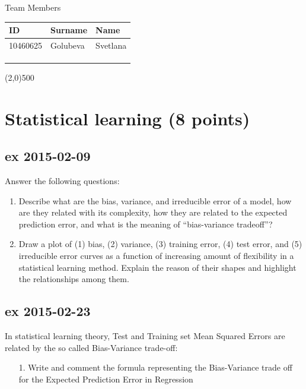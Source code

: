 \documentclass[a4paper,12pt,titlepage]{article} %
\begin{document}
\begin{titlepage}
		\vspace{20pt}
		
		\begin{center}
			{\large Team Members}
		\end{center}
		\begin{tabularx}{\textwidth}{|X|X|X|}
			\hline
			ID & Surname & Name\\
			\hline
			10460625 & Golubeva & Svetlana\\
			\hline
			&  & \\
			\hline
			&  & \\
			\hline
			&  & \\
			\hline
		\end{tabularx}
		
		\vspace{\fill}
		\begin{center}
			\line(2,0){500}
		\end{center}
		
	\end{titlepage}
\tableofcontents

\newpage
\section{Statistical learning (8 points)}
\subsection{ex 2015-02-09}
Answer the following questions:
\begin{enumerate}
\item Describe what are the bias, variance, and irreducible error of a model, how are they related with its complexity, how they are related to the expected prediction error, and what is the meaning of “bias-variance tradeoff”?
\item Draw a plot of (1) bias, (2) variance, (3) training error, (4) test error, and (5) irreducible error curves as a function of increasing amount of flexibility in a statistical learning method. Explain the reason of their shapes and highlight the relationships among them.
\end{enumerate}

\subsection{ex 2015-02-23}
In statistical learning theory, Test and Training set Mean Squared Errors are related by the so called Bias-Variance trade-off:
\begin{itemize}
\item[1.] Write and comment the formula representing the Bias-Variance trade off for the Expected Prediction Error in Regression
\end{itemize}
\end{document}
